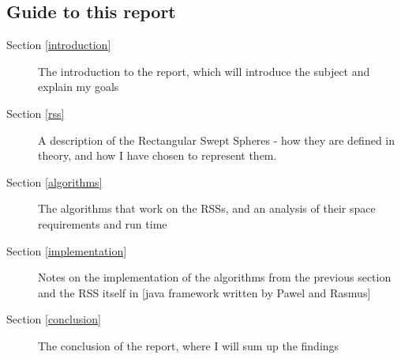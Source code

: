 \subsection{Guide to this report}
\begin{description}
\item[Section \ref{introduction}] The introduction to the report, which will introduce the subject and explain my goals
\item[Section \ref{rss}] A description of the Rectangular Swept Spheres - how they are defined in theory, and how I have chosen to represent them.
\item[Section \ref{algorithms}] The algorithms that work on the RSSs, and an analysis of their space requirements and run time 
\item[Section \ref{implementation}] Notes on the implementation of the algorithms from the previous section and the RSS itself in [java framework written by Pawel and Rasmus] 
\item[Section \ref{conclusion}] The conclusion of the report, where I will sum up the findings  
\end{description}
